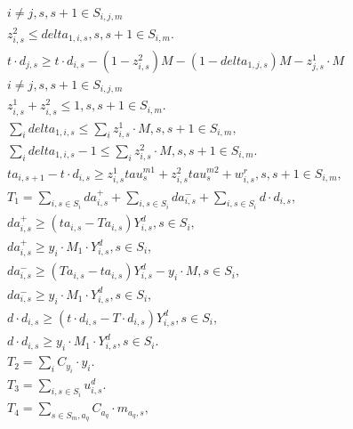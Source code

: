 \begin{align}
  & i \neq j , s , s + 1 \in S_{i , j , m} \tag{eq\_0028\_b} \\
  & z_{i , s}^{2} \leq \mathit{delta}_{1 , i , s} , s , s + 1 \in S_{i , m} . \tag{eq\_0029} \\
  & t \cdot d_{j , s} \geq t \cdot d_{i , s} - \left(1 - z_{i , s}^{2}\right) M - \left(1 - \mathit{delta}_{1 , j , s}\right) M - z_{j , s}^{1} \cdot M \tag{eq\_0030\_a} \\
  & i \neq j , s , s + 1 \in S_{i , j , m} \tag{eq\_0030\_b} \\
  & z_{i , s}^{1} + z_{i , s}^{2} \leq 1 , s , s + 1 \in S_{i , m} . \tag{eq\_0031} \\
  & \sum_{i} \mathit{delta}_{1 , i , s} \leq \sum_{i} z_{i , s}^{1} \cdot M , s , s + 1 \in S_{i , m} , \tag{eq\_0032} \\
  & \sum_{i} \mathit{delta}_{1 , i , s} - 1 \leq \sum_{i} z_{i , s}^{2} \cdot M , s , s + 1 \in S_{i , m} . \tag{eq\_0033} \\
  & t a_{i , s + 1} - t \cdot d_{i , s} \geq z_{i , s}^{1} \mathit{tau}_{s}^{m 1} + z_{i , s}^{2} \mathit{tau}_{s}^{m 2} + w_{i , s}^{r} , s , s + 1 \in S_{i , m} , \tag{eq\_0034} \\
  & T_{1} = \sum_{i, s \in S_{i}} d a_{i , s}^{+} + \sum_{i, s \in S_{i}} d a_{i , s}^{-} + \sum_{i, s \in S_{i}} d \cdot d_{i , s} , \tag{eq\_0035} \\
  & d a_{i , s}^{+} \geq \left(t a_{i , s} - T a_{i , s}\right) Y_{i , s}^{d} , s \in S_{i} , \tag{eq\_0036} \\
  & d a_{i , s}^{+} \geq y_{i} \cdot M_{1} \cdot Y_{i , s}^{d} , s \in S_{i} , \tag{eq\_0037} \\
  & d a_{i , s}^{-} \geq \left(T a_{i , s} - t a_{i , s}\right) Y_{i , s}^{d} - y_{i} \cdot M , s \in S_{i} , \tag{eq\_0038} \\
  & d a_{i , s}^{-} \geq y_{i} \cdot M_{1} \cdot Y_{i , s}^{d} , s \in S_{i} , \tag{eq\_0039} \\
  & d \cdot d_{i , s} \geq \left(t \cdot d_{i , s} - T \cdot d_{i , s}\right) Y_{i , s}^{d} , s \in S_{i} , \tag{eq\_0040} \\
  & d \cdot d_{i , s} \geq y_{i} \cdot M_{1} \cdot Y_{i , s}^{d} , s \in S_{i} . \tag{eq\_0041} \\
  & T_{2} = \sum_{i} C_{y_{i}} \cdot y_{i} . \tag{eq\_0042} \\
  & T_{3} = \sum_{i, s \in S_{i}} u_{i , s}^{d} . \tag{eq\_0043} \\
  & T_{4} = \sum_{s \in S_{m}, a_{q}} C_{a_{q}} \cdot m_{a_{q} , s} , \tag{eq\_0044} \\

\end{align}
